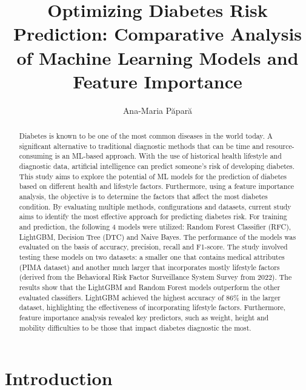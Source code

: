 \documentclass[runningheads]{llncs}
\begin{document}
\title{Optimizing Diabetes Risk Prediction:
Comparative Analysis of Machine Learning Models and
Feature Importance}

\author{Ana-Maria P\u{a}par\u{a} }

\maketitle
\begin{abstract}
Diabetes is known to be one of the most common diseases in the world today. A significant alternative to traditional diagnostic methods that can be time and resource-consuming is an ML-based approach. With the use of historical health lifestyle and diagnostic data, artificial intelligence can predict someone's risk of developing diabetes. 
This study aims to explore the potential of ML models for the prediction of diabetes based on different health and lifestyle factors. Furthermore, using a feature importance analysis, the objective is to determine the factors that affect the most diabetes condition. By evaluating multiple methods, configurations and datasets, current study aims to identify the most effective approach for predicting diabetes risk.  
For training and prediction, the following 4 models were utilized: Random Forest Classifier (RFC), LightGBM, Decision Tree (DTC) and Naive Bayes. The performance of the models was evaluated on the basis of accuracy, precision, recall and F1-score. The study involved testing these models on two datasets: a smaller one that contains medical attributes (PIMA dataset) and another much larger that incorporates mostly lifestyle factors (derived from the Behavioral Risk Factor Surveillance System Survey from 2022).        The results show that the LightGBM and Random Forest models outperform the other evaluated classifiers. LightGBM achieved the highest accuracy of 86\% in the larger dataset, highlighting the effectiveness of incorporating lifestyle factors. Furthermore, feature importance analysis revealed key predictors, such as weight, height and mobility difficulties to be those that impact diabetes diagnostic the most.       
\end{abstract}


\section{Introduction}
\label{section:introduction}
\end{document}
